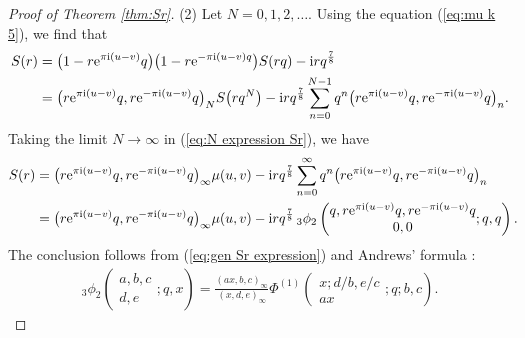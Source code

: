 \documentclass[pdftex]{sigma}
\numberwithin{equation}{section}
\theoremstyle{definition}
\begin{document}
\begin{proof}[Proof of Theorem \ref{thm:Sr}]
(2) Let $N=0,1,2,\dots$. Using the equation (\ref{eq:mu k 5}), we find that
\begin{align}
S(r)
 &=
 \big(1-r{\rm e}^{\pi{\rm i}(u-v)}q\big)\big(1-r{\rm e}^{-\pi{\rm i}(u-v)q}\big)S(rq)-{\rm i}rq^\frac{7}{8} \nonumber \\
 &=
\label{eq:N expression Sr}
 \big(r{\rm e}^{\pi{\rm i}(u-v)}q,r{\rm e}^{-\pi{\rm i}(u-v)}q\big)_NS\big(rq^N\big)-
 {\rm i}rq^\frac{7}{8}\sum_{n=0}^{N-1}q^n\big(r{\rm e}^{\pi{\rm i}(u-v)}q,r{\rm e}^{-\pi{\rm i}(u-v)}q\big)_n.
\end{align}
Taking the limit $N \to \infty$ in (\ref{eq:N expression Sr}), we have
\begin{align}
S(r)
 &=
 \big(r{\rm e}^{\pi{\rm i}(u-v)}q,r{\rm e}^{-\pi{\rm i}(u-v)}q\big)_\infty\mu(u,v)-
 {\rm i}rq^\frac{7}{8}\sum_{n=0}^\infty q^n\big(r{\rm e}^{\pi{\rm i}(u-v)}q,r{\rm e}^{-\pi{\rm i}(u-v)}q\big)_n \nonumber \\
 &=
 \big(r{\rm e}^{\pi{\rm i}(u-v)}q,r{\rm e}^{-\pi{\rm i}(u-v)}q\big)_{\infty }
 \mu(u,v)
 -
 {\rm i}rq^{\frac{7}{8}}\,{_{3}\phi _2}\left(\begin{matrix}q, r{\rm e}^{\pi{\rm i}(u-v)}q, r{\rm e}^{-\pi{\rm i}(u-v)}q \\ 0,0 \end{matrix};q,q\right).\!\!\!\label{eq:gen Sr expression}
\end{align}
The conclusion follows from (\ref{eq:gen Sr expression}) and Andrews' formula \cite[p.~298, Exercise 10.8]{GR}:
\begin{gather}
\label{eq:Andrews formula}
{_{3}\phi _2}\left(\begin{matrix}a,b,c \\ d,e \end{matrix};q,x\right)
 =
 \frac{(ax,b,c)_{\infty }}{(x,d,e)_{\infty }}
 \Phi^{(1)}\left(\begin{matrix}x;d/b,e/c \\ ax \end{matrix};q;b,c\right).
\end{gather}


\end{proof}
\end{document}
